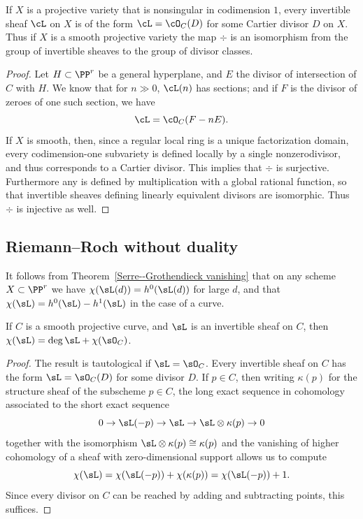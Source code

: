\begin{corollary}\label{invertible sheaves and divisors}
If $X$ is a projective variety that is nonsingular in codimension $1$,
every invertible sheaf $\cL$ on $X$ is of the form $\cL =\cO_C(D)$ for some 
%
Cartier divisor $D$ on $X$. Thus if $X$ is a smooth projective variety
%
the map $\div$ is an isomorphism from the group of invertible sheaves
to the group 
of divisor classes.
\end{corollary}

\begin{proof}
Let $H \subset \PP^r$ be a general hyperplane, and $E$  the divisor  of intersection of $C$ with $H$. We know that for $n \gg 0$, $\cL(n)$ has sections; and if $F$ is the divisor of zeroes of one such section, we have
$$
\cL = \cO_C(F - nE).
$$
If $X$ is smooth, then, since a regular local ring is a unique
factorization domain, every codimension-one subvariety is defined locally 
by a single nonzerodivisor, and thus corresponds to a Cartier divisor.
This implies that $\div$ is surjective. Furthermore any 
%
is defined by multiplication with a global rational function, so that invertible sheaves defining linearly equivalent divisors are
isomorphic. Thus $\div$ is injective as well.
\end{proof}

\subsection*{Riemann--Roch without duality}

It follows from Theorem~\ref{Serre--Grothendieck vanishing} that on
any scheme $X\subset \PP^r$ we have $\chi(\sL(d)) = h^0(\sL(d))$ for
large $d$, 
and that $\chi(\sL) = h^0(\sL) - h^1(\sL)$ in the case of a curve.

\begin{theorem}\label{easy RR}
If $C$ is a smooth projective curve, and $\sL$ is an invertible sheaf on $C$, then $\chi(\sL) = \deg \sL + \chi(\sO_C)$.
%
\end{theorem}

\begin{proof}
 The result is tautological if $\sL = \sO_C$. Every invertible sheaf on $C$ has the form $\sL = \sO_C(D)$ for some
divisor $D$. If $p\in C$, then writing $\kappa(p)$ for the
structure sheaf of the subscheme $p\in C$, the long exact sequence in cohomology
associated to the short exact sequence
$$
0\to \sL(-p) \to \sL \to \sL\otimes \kappa(p)\to 0
$$
together with the isomorphism $\sL\otimes \kappa(p) \cong \kappa(p)$
and the vanishing of higher cohomology of a sheaf with zero-dimensional support allows us to compute 
$$
\chi(\sL) = \chi(\sL(-p)) + \chi(\kappa(p)) = \chi(\sL(-p)) + 1.
$$
Since every divisor on $C$ can be reached by adding and subtracting points, this suffices.
\end{proof}

